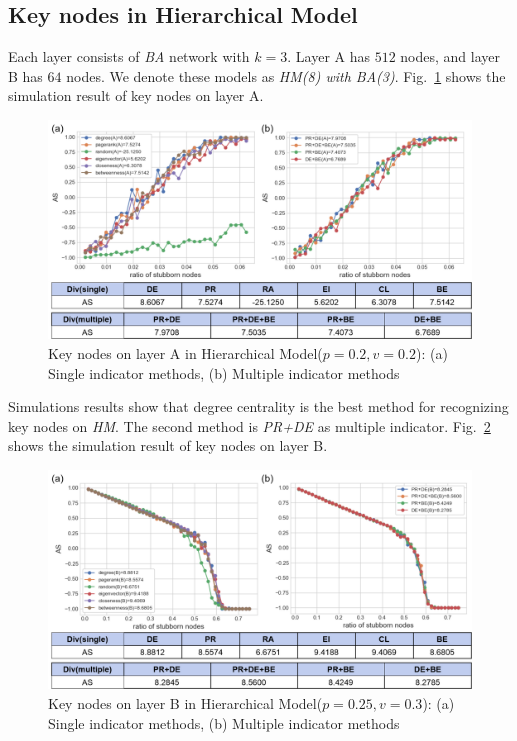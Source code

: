 \subsection{Key nodes in Hierarchical Model}
Each layer consists of \textit{BA} network with $k=3$. Layer A has $512$ nodes, and layer B has $64$ nodes. We denote these models as \textit{HM(8) with BA(3)}.
Fig.~\ref{chap5_keynode_HM_A} shows the simulation result of key nodes on layer A.
\begin{figure}[!htb]
	\centering
	\includegraphics[width=\hsize]{figure/chap5_keynode_HM_A.png}
	\caption{Key nodes on layer A in Hierarchical Model($p=0.2, v=0.2$):
		(a) Single indicator methods, (b) Multiple indicator methods}
	\label{chap5_keynode_HM_A}
\end{figure}
Simulations results show that degree centrality is the best method for recognizing key nodes on \textit{HM}. The second method is \textit{PR+DE} as multiple indicator. 
Fig.~\ref{chap5_keynode_HM_B} shows the simulation result of key nodes on layer B.
\begin{figure}[!htb]
	\centering
	\includegraphics[width=\hsize]{figure/chap5_keynode_HM_B.png}
	\caption{Key nodes on layer B in Hierarchical Model($p=0.25, v=0.3$):
		(a) Single indicator methods, (b) Multiple indicator methods}
	\label{chap5_keynode_HM_B}
\end{figure}

